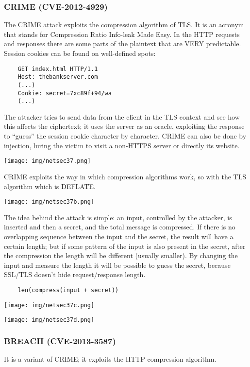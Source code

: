 \documentclass[a4paper, 10pt, titlepage]{article}
\begin{document}
\subsubsection{CRIME (CVE-2012-4929)}
The CRIME attack exploits the compression algorithm of TLS. It is an acronym that stands for Compression Ratio Info-leak Made Easy. In the HTTP requests and responses there are some parts of the plaintext that are VERY predictable. Session cookies can be found on well-defined spots:
\begin{lstlisting}
	GET index.html HTTP/1.1
	Host: thebankserver.com
	(...)
	Cookie: secret=7xc89f+94/wa
	(...)
\end{lstlisting}
The attacker tries to send data from the client in the TLS context and see how this affects the ciphertext; it uses the server as an oracle, exploiting the response to “guess” the session cookie character by character. CRIME can also be done by injection, luring the victim to visit a non-HTTPS server or directly its website.
\begin{center}
	\texttt{[image: img/netsec37.png]}
\end{center}
CRIME exploits the way in which compression algorithms work, so with the TLS algorithm which is DEFLATE.
\begin{center}
	\texttt{[image: img/netsec37b.png]}
\end{center}
The idea behind the attack is simple: an input, controlled by the attacker, is inserted and then a secret, and the total message is compressed. If there is no overlapping sequence between the input and the secret, the result will have a certain length; but if some pattern of the input is also present in the secret, after the compression the length will be different (usually smaller). By changing the input and measure the length it will be possible to guess the secret, because SSL/TLS doesn't hide request/response length.
\begin{lstlisting}
	len(compress(input + secret))
\end{lstlisting}
\begin{center}
	\texttt{[image: img/netsec37c.png]}
\end{center}
\begin{center}
	\texttt{[image: img/netsec37d.png]}
\end{center}

\subsubsection{BREACH (CVE-2013-3587)}
It is a variant of CRIME; it exploits the HTTP compression algorithm.
\end{document}
